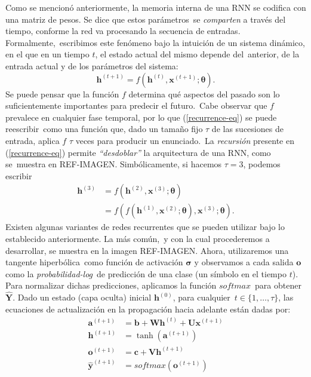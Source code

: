 \noindent
Como se mencionó anteriormente, la memoria interna de una RNN se codifica con una matriz de pesos. Se dice que estos parámetros\
se \emph{comparten} a través del tiempo, conforme la red va procesando la secuencia de entradas. Formalmente,\
escribimos este fenómeno bajo la intuición de un sistema dinámico, en el que en un tiempo $t$, el estado actual del mismo depende del\
anterior, de la entrada actual y de los parámetros del sistema:
\begin{equation} \label{recurrence-eq}
  \mathbf{h}^{(t+1)} = f(\mathbf{h}^{(t)}, \mathbf{x}^{(t+1)}; \mathbf{\theta}).
\end{equation}
Se puede pensar que la función $f$ determina qué aspectos del pasado son lo suficientemente importantes para predecir el futuro.\
Cabe observar que $f$ prevalece en cualquier fase temporal, por lo que (\ref{recurrence-eq}) se puede reescribir\
como una función que, dado un tamaño fijo $\tau$ de las sucesiones de entrada, aplica $f$ $\tau$ veces para producir un enunciado.\
La \emph{recursión} presente en (\ref{recurrence-eq}) permite \emph{``desdoblar''} la arquitectura de una RNN, como se\
muestra en REF-IMAGEN. Simbólicamente, si hacemos $\tau = 3$, podemos escribir
\begin{align}
  \mathbf{h}^{(3)} &= f(\mathbf{h}^{(2)}, \mathbf{x}^{(3)}; \mathbf{\theta})\\
  &= f(f(\mathbf{h}^{(1)}, \mathbf{x}^{(2)}; \mathbf{\theta}), \mathbf{x}^{(3)}; \mathbf{\theta}).
\end{align}
Existen algunas variantes de redes recurrentes que se pueden utilizar bajo lo establecido anteriormente. La más común,\
y con la cual procederemos a desarrollar, se muestra en la imagen REF-IMAGEN. Ahora, utilizaremos una tangente hiperbólica\
como función de activación $\mathbf{\sigma}$ y observamos a cada salida $\mathbf{o}$ como la \emph{probabilidad-log}\
de predicción de una clase (un símbolo en el tiempo $t$). Para normalizar dichas predicciones, aplicamos la función $softmax$\
para obtener $\mathbf{\hat{Y}}$. Dado un estado (capa oculta) inicial $\mathbf{h}^{(0)}$, para cualquier\
$t \in \{1,\ldots,\tau\}$, las ecuaciones de actualización en la propagación hacia adelante están dadas por:
\begin{align} \label{rnn-feed-forward}
  \mathbf{a}^{(t+1)} &= \mathbf{b} + \mathbf{W}\mathbf{h}^{(t)} + \mathbf{U}\mathbf{x}^{(t+1)}\\
  \mathbf{h}^{(t+1)} &= \tanh(\mathbf{a}^{(t+1)})\\
  \mathbf{o}^{(t+1)} &= \mathbf{c} + \mathbf{V}\mathbf{h}^{(t+1)}\\
  \mathbf{\hat{y}}^{(t+1)} &= softmax(\mathbf{o}^{(t+1)}) \label{rnn-y}
\end{align}
